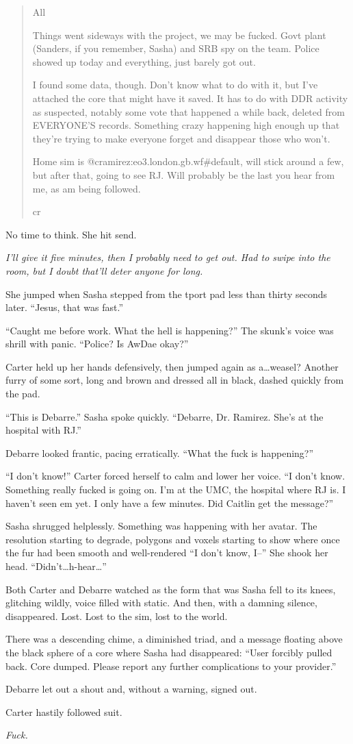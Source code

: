 \begin{quote}
All

Things went sideways with the project, we may be fucked. Govt plant (Sanders, if you remember, Sasha) and SRB spy on the team. Police showed up today and everything, just barely got out.

I found some data, though. Don't know what to do with it, but I've attached the core that might have it saved. It has to do with DDR activity as suspected, notably some vote that happened a while back, deleted from EVERYONE'S records. Something crazy happening high enough up that they're trying to make everyone forget and disappear those who won't.

Home sim is @cramirez:eo3.london.gb.wf\#default, will stick around a few, but after that, going to see RJ. Will probably be the last you hear from me, as am being followed.

cr
\end{quote}

No time to think. She hit send.

\emph{I'll give it five minutes, then I probably need to get out. Had to swipe into the room, but I doubt that'll deter anyone for long.}

She jumped when Sasha stepped from the tport pad less than thirty seconds later. ``Jesus, that was fast.''

``Caught me before work. What the hell is happening?'' The skunk's voice was shrill with panic. ``Police? Is AwDae okay?''

Carter held up her hands defensively, then jumped again as a\ldots{}weasel? Another furry of some sort, long and brown and dressed all in black, dashed quickly from the pad.

``This is Debarre.'' Sasha spoke quickly. ``Debarre, Dr. Ramirez. She's at the hospital with RJ.''

Debarre looked frantic, pacing erratically. ``What the fuck is happening?''

``I don't know!'' Carter forced herself to calm and lower her voice. ``I don't know. Something really fucked is going on. I'm at the UMC, the hospital where RJ is. I haven't seen em yet. I only have a few minutes. Did Caitlin get the message?''

Sasha shrugged helplessly. Something was happening with her avatar. The resolution starting to degrade, polygons and voxels starting to show where once the fur had been smooth and well-rendered ``I don't know, I--'' She shook her head. ``Didn't\ldots{}h-hear\ldots{}''

Both Carter and Debarre watched as the form that was Sasha fell to its knees, glitching wildly, voice filled with static. And then, with a damning silence, disappeared. Lost. Lost to the sim, lost to the world.

There was a descending chime, a diminished triad, and a message floating above the black sphere of a core where Sasha had disappeared: ``User forcibly pulled back. Core dumped. Please report any further complications to your provider.''

Debarre let out a shout and, without a warning, signed out.

Carter hastily followed suit.

\emph{Fuck.}
